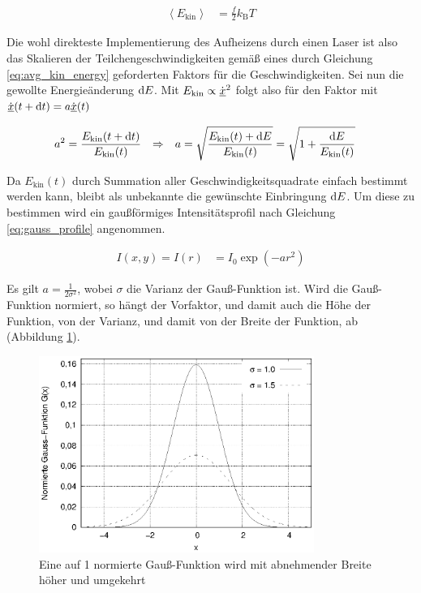 		\begin{align}
			\left\langle E_\text{kin} \right\rangle &= \frac{f}{2} k_\text{B} T
				\label{eq:avg_kin_energy}
		\end{align}

		Die wohl direkteste Implementierung des Aufheizens durch einen Laser ist also das
		Skalieren der Teilchengeschwindigkeiten gemäß eines durch Gleichung
		\eqref{eq:avg_kin_energy} geforderten Faktors für die Geschwindigkeiten. Sei nun die
		gewollte Energieänderung $\dx[E]$. Mit $E_\text{kin} \propto \dot{\uvec{x}}^2$ folgt
		also für den Faktor mit $\dot{\uvec{x}}(t + \dt) = a\dot{\uvec{x}}(t)$

		\begin{align}
			a^2 &= \frac{E_\text{kin}(t + \dt)}{E_\text{kin}(t)}
			&\Rightarrow&&
			a &= \sqrt{\frac{E_\text{kin}(t) + \dx[E]}{E_\text{kin}(t)}}
				= \sqrt{1 + \frac{\dx[E]}{E_\text{kin}(t)}}
		\end{align}

		Da $E_\text{kin}(t)$ durch Summation aller Geschwindigkeitsquadrate einfach bestimmt
		werden kann, bleibt als unbekannte die gewünschte Einbringung $\dx[E]$. Um diese zu
		bestimmen wird ein gaußförmiges Intensitätsprofil nach Gleichung \eqref{eq:gauss_profile}
		angenommen.

		\begin{align}
			I(x,y) = I(r) &= I_0 \exp\left(-a r^2\right) \label{eq:gauss_profile}
		\end{align}

		Es gilt $a = \frac{1}{2\sigma^2}$, wobei $\sigma$ die Varianz der Gauß-Funktion ist.
		Wird die Gauß-Funktion normiert, so hängt der Vorfaktor, und damit auch die Höhe der
		Funktion, von der Varianz, und damit von der Breite der Funktion, ab
		(Abbildung \ref{fig:gauss}).

		\begin{figure}
			\centering
			\includegraphics[width=0.8\textwidth]{chapter/main/plt/gauss.eps}
			\caption{Eine auf 1 normierte Gauß-Funktion wird mit abnehmender Breite höher und
			umgekehrt}
			\label{fig:gauss}
		\end{figure}

